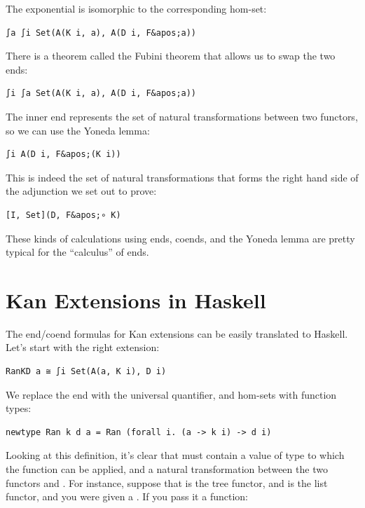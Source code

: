 The exponential is isomorphic to the corresponding hom-set:

\begin{verbatim}
∫a ∫i Set(A(K i, a), A(D i, F&apos;a))
\end{verbatim}

There is a theorem called the Fubini theorem that allows us to swap the
two ends:

\begin{verbatim}
∫i ∫a Set(A(K i, a), A(D i, F&apos;a))
\end{verbatim}

The inner end represents the set of natural transformations between two
functors, so we can use the Yoneda lemma:

\begin{verbatim}
∫i A(D i, F&apos;(K i))
\end{verbatim}

This is indeed the set of natural transformations that forms the right
hand side of the adjunction we set out to prove:

\begin{verbatim}
[I, Set](D, F&apos;∘ K)
\end{verbatim}

These kinds of calculations using ends, coends, and the Yoneda lemma are
pretty typical for the ``calculus'' of ends.

\section{Kan Extensions in Haskell}\label{kan-extensions-in-haskell}

The end/coend formulas for Kan extensions can be easily translated to
Haskell. Let's start with the right extension:

\begin{verbatim}
RanKD a ≅ ∫i Set(A(a, K i), D i)
\end{verbatim}

We replace the end with the universal quantifier, and hom-sets with
function types:

\begin{verbatim}
newtype Ran k d a = Ran (forall i. (a -> k i) -> d i)
\end{verbatim}

Looking at this definition, it's clear that  must contain a
value of type  to which the function can be applied, and a
natural transformation between the two functors  and
. For instance, suppose that  is the tree functor,
and  is the list functor, and you were given a
. If you pass it a function:

